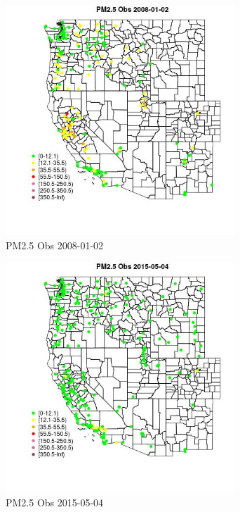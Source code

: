 \begin{figure} 
\centering  
\includegraphics[width=0.77\textwidth]{Code_Outputs/Report_ML_input_PM25_Step4_part_e_de_duplicated_aves_compiled_2019-05-18wNAs_MapObsPM25_Obs2008-01-02.jpg} 
\caption{\label{fig:Report_ML_input_PM25_Step4_part_e_de_duplicated_aves_compiled_2019-05-18wNAsMapObsPM25_Obs2008-01-02}PM2.5 Obs 2008-01-02} 
\end{figure} 
 

\begin{figure} 
\centering  
\includegraphics[width=0.77\textwidth]{Code_Outputs/Report_ML_input_PM25_Step4_part_e_de_duplicated_aves_compiled_2019-05-18wNAs_MapObsPM25_Obs2015-05-04.jpg} 
\caption{\label{fig:Report_ML_input_PM25_Step4_part_e_de_duplicated_aves_compiled_2019-05-18wNAsMapObsPM25_Obs2015-05-04}PM2.5 Obs 2015-05-04} 
\end{figure} 
 

